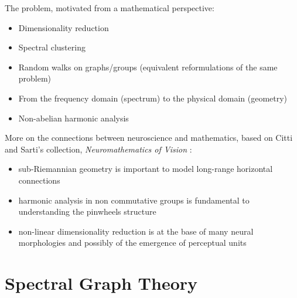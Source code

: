 \par The problem, motivated from a mathematical perspective:
\begin{itemize}
    \item Dimensionality reduction 
    \item Spectral clustering
    \item Random walks on graphs/groups (equivalent reformulations of the same problem)
    \item From the frequency domain (spectrum) to the physical domain (geometry)
    \item Non-abelian harmonic analysis
\end{itemize}
\par More on the connections between neuroscience and mathematics, based on Citti and Sarti's collection, \textit{Neuromathematics of Vision} \cite{citti_neuromathematics_2014}:
\begin{itemize}
    \item sub-Riemannian geometry is important to model long-range horizontal connections
    \item harmonic analysis in non commutative groups is fundamental to understanding the pinwheels structure 
    \item non-linear dimensionality reduction is at the base of many neural morphologies and possibly of the emergence of perceptual units
\end{itemize}

\section{Spectral Graph Theory}


